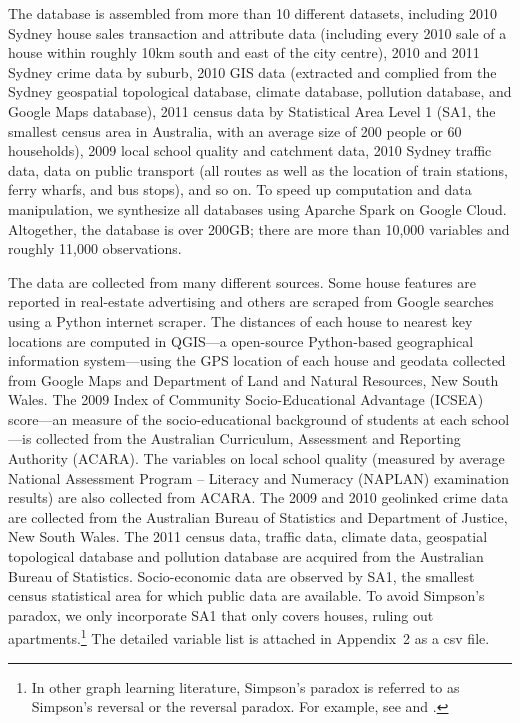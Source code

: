 \documentclass[11pt,review,authoryear]{elsarticle}
\begin{document}
The database is assembled from more than 10 different datasets, including 2010 Sydney house sales transaction and attribute data (including every 2010 sale of a house within roughly 10km south and east of the city centre), 2010 and 2011 Sydney crime data by suburb, 2010 GIS data (extracted and complied from the Sydney geospatial topological database, climate database, pollution database, and Google Maps database), 2011 census data by Statistical Area Level 1 (SA1, the smallest census area in Australia, with an average size of 200 people or 60 households), 2009 local school quality and catchment data, 2010 Sydney traffic data, data on public transport (all routes as well as the location of train stations, ferry wharfs, and bus stops), and so on. To speed up computation and data manipulation, we synthesize all databases using \textsf{Aparche Spark} on Google Cloud. Altogether, the database is over 200GB; there are more than 10,000 variables and roughly 11,000 observations.

The data are collected from many different sources. Some house features are reported in real-estate advertising and others are scraped from Google searches using a \textsf{Python} internet scraper. The distances of each house to nearest key locations are computed in QGIS---a open-source \textsf{Python}-based geographical information system---using the GPS location of each house and geodata collected from Google Maps and Department of Land and Natural Resources, New South Wales. The 2009 Index of Community Socio-Educational Advantage (ICSEA) score---an measure of the socio-educational background of students at each school---is collected from the Australian Curriculum, Assessment and Reporting Authority (ACARA). The variables on local school quality (measured by average National Assessment Program -- Literacy and Numeracy (NAPLAN) examination results) are also collected from ACARA. The 2009 and 2010 geolinked crime data are collected from the Australian Bureau of Statistics and Department of Justice, New South Wales. The 2011 census data, traffic data, climate data, geospatial topological database and pollution database are acquired from the Australian Bureau of Statistics. Socio-economic data are observed by SA1, the smallest census statistical area for which public data are available. To avoid Simpson's paradox, we only incorporate SA1 that only covers houses, ruling out apartments.\footnote{In other graph learning literature, Simpson's paradox is referred to as Simpson's reversal or the reversal paradox. For example, see \citet{simpson1951interpretation} and \citet{blyth1972simpson}.} The detailed variable list is attached in Appendix~2 as a csv file.
\end{document}
